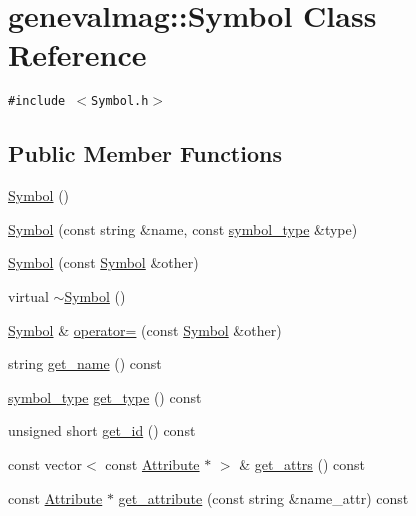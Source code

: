 \hypertarget{classgenevalmag_1_1Symbol}{
\section{genevalmag::Symbol Class Reference}
\label{classgenevalmag_1_1Symbol}
}
{\tt \#include $<$Symbol.h$>$}

\subsection*{Public Member Functions}
\begin{CompactItemize}
\item 
\hyperlink{classgenevalmag_1_1Symbol_52c72b2631eb77cec685aae2bd61ab4d}{Symbol} ()
\item 
\hyperlink{classgenevalmag_1_1Symbol_2b522913fae452ad9c5a32587a122450}{Symbol} (const string \&name, const \hyperlink{namespacegenevalmag_4c1cf205cb145b09e46df5277bcc70c6}{symbol\_\-type} \&type)
\item 
\hyperlink{classgenevalmag_1_1Symbol_16cbf4081db9ad6ba822270ede78cfb6}{Symbol} (const \hyperlink{classgenevalmag_1_1Symbol}{Symbol} \&other)
\item 
virtual \hyperlink{classgenevalmag_1_1Symbol_0701e9b520243d48a2c2a34f5d105194}{$\sim$Symbol} ()
\item 
\hyperlink{classgenevalmag_1_1Symbol}{Symbol} \& \hyperlink{classgenevalmag_1_1Symbol_4f51c5b39b2a272210fc7a15d07bdd4e}{operator=} (const \hyperlink{classgenevalmag_1_1Symbol}{Symbol} \&other)
\item 
string \hyperlink{classgenevalmag_1_1Symbol_fcd9c46fe546ec9f1b62caeb99377917}{get\_\-name} () const 
\item 
\hyperlink{namespacegenevalmag_4c1cf205cb145b09e46df5277bcc70c6}{symbol\_\-type} \hyperlink{classgenevalmag_1_1Symbol_fc8f4add5f5fd5c93b469f18392e932d}{get\_\-type} () const 
\item 
unsigned short \hyperlink{classgenevalmag_1_1Symbol_e9a6e2cd92092a417cf0ba9993792303}{get\_\-id} () const 
\item 
const vector$<$ const \hyperlink{classgenevalmag_1_1Attribute}{Attribute} $\ast$ $>$ \& \hyperlink{classgenevalmag_1_1Symbol_2691d14dc2083bb95c5c18017ad76c21}{get\_\-attrs} () const 
\item 
const \hyperlink{classgenevalmag_1_1Attribute}{Attribute} $\ast$ \hyperlink{classgenevalmag_1_1Symbol_58f45135b17a802eb9e124d91875204b}{get\_\-attribute} (const string \&name\_\-attr) const 
\item 

\end{CompactItemize}
